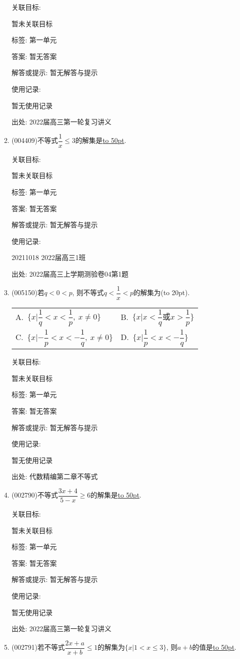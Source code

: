 \documentclass[10pt,a4paper]{article}
\newcommand{\blank}[1]{\underline{\hbox to #1pt{}}}
\newcommand{\bracket}[1]{(\hbox to #1pt{})}
\newcommand{\twoch}[4]{\par\begin{tabular}{p{.46\textwidth}p{.46\textwidth}}
A.~#1& B.~#2\\
C.~#3& D.~#4
\end{tabular}}
\begin{document}
\begin{enumerate}[1.]
关联目标:

暂未关联目标



标签: 第一单元

答案: 暂无答案

解答或提示: 暂无解答与提示

使用记录:

暂无使用记录


出处: 2022届高三第一轮复习讲义
\item { (004409)}不等式$\dfrac 1x\le 3$的解集是\blank{50}.


关联目标:

暂未关联目标



标签: 第一单元

答案: 暂无答案

解答或提示: 暂无解答与提示

使用记录:

20211018	2022届高三1班	


出处: 2022届高三上学期测验卷04第1题
\item { (005150)}若$q<0<p$, 则不等式$q<\dfrac 1x<p$的解集为\bracket{20}.
\twoch{$\{x|\dfrac 1q<x<\dfrac 1p,\  x\ne 0\}$}{$\{x|x<\dfrac 1q\text{或}x>\dfrac 1p\}$}{$\{x|-\dfrac 1p<x<-\dfrac 1q, \ x\ne 0\}$}{$\{x|\dfrac 1p<x<-\dfrac 1q\}$}


关联目标:

暂未关联目标



标签: 第一单元

答案: 暂无答案

解答或提示: 暂无解答与提示

使用记录:

暂无使用记录


出处: 代数精编第二章不等式
\item { (002790)}不等式$\dfrac{3x+4}{5-x}\ge 6$的解集是\blank{50}.


关联目标:

暂未关联目标



标签: 第一单元

答案: 暂无答案

解答或提示: 暂无解答与提示

使用记录:

暂无使用记录


出处: 2022届高三第一轮复习讲义
\item { (002791)}若不等式$\dfrac{2x+a}{x+b}\le 1$的解集为$\{x|1<x\le 3\}$, 则$a+b$的值是\blank{50}.



\end{enumerate}
\end{document}
